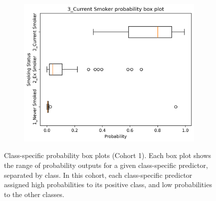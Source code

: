 \documentclass{article} %
\begin{document}
\begin{figure}[htb]
\begin{subfigure}{0.48\linewidth}
        \centering
        \includegraphics[width=\linewidth]{cohort1/test_boxplot_3.png}
    \end{subfigure}
    \caption[Class-specific probability box plots (Cohort 1)]{Class-specific probability box plots (Cohort 1). Each box plot shows the range of probability outputs for a given class-specific predictor, separated by class. In this cohort, each class-specific predictor assigned high probabilities to its positive class, and low probabilities to the other classes.}
    \label{fig:cohort1-boxplots}
\end{figure}


\end{document}
